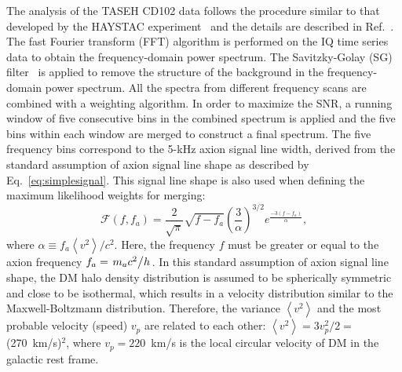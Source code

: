 \documentclass[%
 reprint,prl, %
 amsmath,amssymb,
 aps,
]{revtex4-2}
\newcommand{\ma}{\ensuremath{m_a}}
\begin{document}
   The analysis of the TASEH CD102 data follows the procedure similar to that 
developed by the HAYSTAC experiment~\cite{HAYSTACII} and the details are 
described in Ref.~\cite{TASEHAnalysis}. The fast Fourier transform (FFT) 
algorithm is performed on the IQ time series data to obtain the 
frequency-domain power spectrum. 
The Savitzky-Golay (SG) 
filter~\cite{SGFilter} is applied to remove the structure of the background 
in the frequency-domain power spectrum. All the spectra from different 
frequency scans are combined with a weighting algorithm. 
In order to maximize the SNR, a running window of 
five consecutive bins in the combined spectrum is applied and the five bins 
within each window are merged to construct a final spectrum. 
The five frequency bins correspond to the 5-kHz axion signal line width,  
derived from the standard assumption of axion signal line shape as described 
by Eq.~\eqref{eq:simplesignal}. 
This signal line shape is also used when defining the maximum likelihood 
weights for merging: 
\begin{equation}
\mathcal{F}(f, f_a) = \frac{2}{\sqrt{\pi}}\sqrt{f-f_a}\left(\frac{3}{\alpha}\right)^{3/2}
e^{\frac{-3\left(f-f_a\right)}{\alpha}},
\label{eq:simplesignal}
\end{equation}
where $\alpha\equiv  f_a \left<v^2\right>/c^2$. 
Here, the frequency $f$ must be greater or equal to the axion frequency 
$f_a=\left.\ma c^2\middle/h\right.$. 
In this standard assumption of axion signal line shape, 
the DM halo density distribution is assumed 
to be spherically symmetric and close to be isothermal, which results in a 
velocity distribution similar to the Maxwell-Boltzmann distribution. 
Therefore, the variance $\left<v^2\right>$ and the most probable velocity
(speed) $v_p$ are related to each other:
$\left<v^2\right>=3v_p^2/2=$(270~km/s)$^2$, where $v_p=220$~km/s is the local
circular velocity of DM in the galactic rest frame. 
\end{document}
